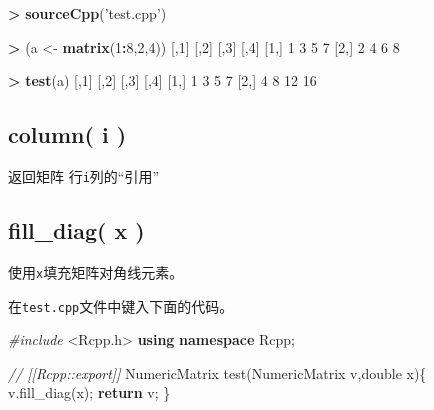 \documentclass[]{ctexbook}
\newenvironment{Shaded}{\begin{snugshade}}{\end{snugshade}}
\newcommand{\KeywordTok}[1]{\textcolor[rgb]{0.13,0.29,0.53}{\textbf{#1}}}
\newcommand{\DataTypeTok}[1]{\textcolor[rgb]{0.13,0.29,0.53}{#1}}
\newcommand{\DecValTok}[1]{\textcolor[rgb]{0.00,0.00,0.81}{#1}}
\newcommand{\StringTok}[1]{\textcolor[rgb]{0.31,0.60,0.02}{#1}}
\newcommand{\ImportTok}[1]{#1}
\newcommand{\CommentTok}[1]{\textcolor[rgb]{0.56,0.35,0.01}{\textit{#1}}}
\newcommand{\ControlFlowTok}[1]{\textcolor[rgb]{0.13,0.29,0.53}{\textbf{#1}}}
\newcommand{\OperatorTok}[1]{\textcolor[rgb]{0.81,0.36,0.00}{\textbf{#1}}}
\newcommand{\PreprocessorTok}[1]{\textcolor[rgb]{0.56,0.35,0.01}{\textit{#1}}}
\newcommand{\NormalTok}[1]{#1}
\begin{document}
\begin{Shaded}
\begin{Highlighting}[]
\OperatorTok{>}\StringTok{ }\KeywordTok{sourceCpp}\NormalTok{(}\StringTok{'test.cpp'}\NormalTok{)}

\OperatorTok{>}\StringTok{ }\NormalTok{(a <-}\StringTok{ }\KeywordTok{matrix}\NormalTok{(}\DecValTok{1}\OperatorTok{:}\DecValTok{8}\NormalTok{,}\DecValTok{2}\NormalTok{,}\DecValTok{4}\NormalTok{))}
\NormalTok{     [,}\DecValTok{1}\NormalTok{] [,}\DecValTok{2}\NormalTok{] [,}\DecValTok{3}\NormalTok{] [,}\DecValTok{4}\NormalTok{]}
\NormalTok{[}\DecValTok{1}\NormalTok{,]    }\DecValTok{1}    \DecValTok{3}    \DecValTok{5}    \DecValTok{7}
\NormalTok{[}\DecValTok{2}\NormalTok{,]    }\DecValTok{2}    \DecValTok{4}    \DecValTok{6}    \DecValTok{8}

\OperatorTok{>}\StringTok{ }\KeywordTok{test}\NormalTok{(a)}
\NormalTok{     [,}\DecValTok{1}\NormalTok{] [,}\DecValTok{2}\NormalTok{] [,}\DecValTok{3}\NormalTok{] [,}\DecValTok{4}\NormalTok{]}
\NormalTok{[}\DecValTok{1}\NormalTok{,]    }\DecValTok{1}    \DecValTok{3}    \DecValTok{5}    \DecValTok{7}
\NormalTok{[}\DecValTok{2}\NormalTok{,]    }\DecValTok{4}    \DecValTok{8}   \DecValTok{12}   \DecValTok{16}
\end{Highlighting}
\end{Shaded}

\subsection{column( i )}\label{columni}

返回矩阵 行\texttt{i}列的``引用''

\subsection{fill\_diag( x )}\label{fill_diag}

使用\texttt{x}填充矩阵对角线元素。

在\texttt{test.cpp}文件中键入下面的代码。

\begin{Shaded}
\begin{Highlighting}[]
\PreprocessorTok{#include }\ImportTok{<Rcpp.h>}
\KeywordTok{using} \KeywordTok{namespace}\NormalTok{ Rcpp;}

\CommentTok{// [[Rcpp::export]]}
\NormalTok{NumericMatrix test(NumericMatrix v,}\DataTypeTok{double}\NormalTok{ x)\{}
\NormalTok{    v.fill_diag(x);}
    \ControlFlowTok{return}\NormalTok{ v;}
\NormalTok{\}}
\end{Highlighting}
\end{Shaded}
\end{document}
